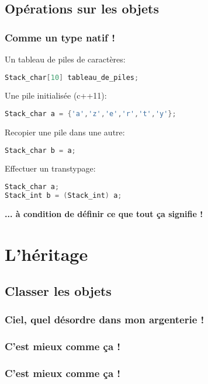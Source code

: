 \documentclass{beamer}
\begin{document}
\subsection {Opérations sur les objets}

\begin{frame}[fragile=singleslide,shrink=20]
\frametitle{Comme un type natif !}
Un tableau de piles de caractères:
\begin{lstlisting}[language=c++]
Stack_char[10] tableau_de_piles;
\end{lstlisting}
Une pile initialisée (c++11):
\begin{lstlisting}[language=c++]
Stack_char a = {'a','z','e','r','t','y'};
\end{lstlisting}
Recopier une pile dans une autre:
\begin{lstlisting}[language=c++]
Stack_char b = a;
\end{lstlisting}
Effectuer un transtypage:
\begin{lstlisting}[language=c++]
Stack_char a;
Stack_int b = (Stack_int) a;
\end{lstlisting}
\textbf{... à condition de définir ce que tout ça signifie !}
\end{frame}

\section{L'héritage}
\subsection {Classer les objets}

\begin{frame}
\frametitle{Ciel, quel désordre dans mon argenterie !}    
\begin{centering}%
%
\par%
\end{centering}%
\end{frame}

\begin{frame}
\frametitle{C'est mieux comme ça !}
\begin{centering}
%
\par%
\end{centering}%
\end{frame}

\begin{frame}
\frametitle{C'est mieux comme ça !}
\begin{centering}
%
\par%
\end{centering}%
\end{frame}
\end{document}
